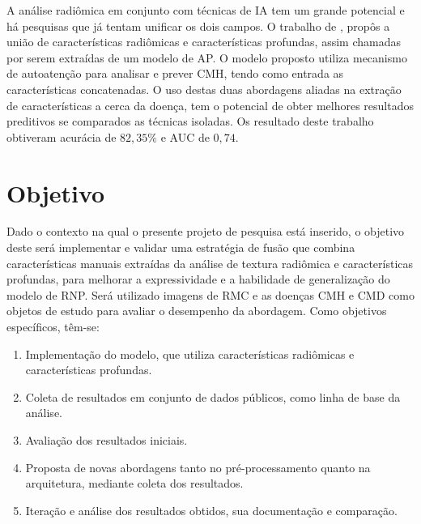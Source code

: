 A análise radiômica em conjunto com técnicas de \gls{IA} tem um grande potencial e há pesquisas que já tentam unificar os dois campos. O trabalho de , propôs a união de características radiômicas e características profundas, assim chamadas por serem extraídas de um modelo de \gls{AP}. O modelo proposto utiliza mecanismo de autoatenção para analisar e prever \gls{CMH}, tendo como entrada as características concatenadas. O uso destas duas abordagens aliadas na extração de características a cerca da doença, tem o potencial de obter melhores resultados preditivos se comparados as técnicas isoladas. Os resultado deste trabalho obtiveram acurácia de $82,35\%$ e AUC de $0,74$.

\newpage

\section{Objetivo}
\label{sec:cap1_objetivo}

Dado o contexto na qual o presente projeto de pesquisa está inserido, o objetivo deste será implementar e validar uma estratégia de fusão que combina características manuais extraídas da análise de textura radiômica e características profundas, para melhorar a expressividade e a habilidade de generalização do modelo de \gls{RNP}. Será utilizado imagens de \gls{RMC} e as doenças \gls{CMH} e \gls{CMD} como objetos de estudo para avaliar o desempenho da abordagem. Como objetivos específicos, têm-se:

\begin{enumerate}

\item Implementação do modelo, que utiliza características radiômicas e
características profundas.

\item Coleta de resultados em conjunto de dados públicos, como linha de base da análise.

\item Avaliação dos resultados iniciais.

\item Proposta de novas abordagens tanto no pré-processamento quanto na arquitetura, mediante coleta dos resultados.

\item Iteração e análise dos resultados obtidos, sua documentação e comparação.
\end{enumerate}

